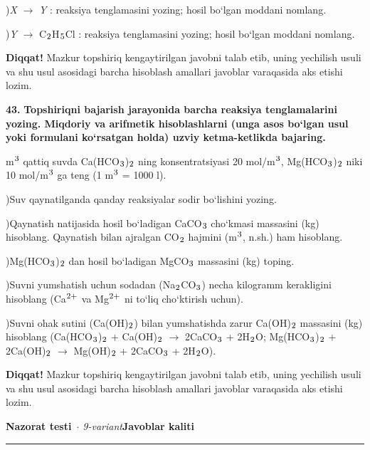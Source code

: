 \documentclass[11pt,a4paper]{article}
\renewcommand{\textsubscript}[1]{\ensuremath{_{\text{\fontsize{8}{8}\selectfont #1}}}}
\renewcommand{\textsuperscript}[1]{\ensuremath{^{\text{\fontsize{8}{8}\selectfont #1}}}}
\newcommand{\diqqat}[1]{\par\smallskip\noindent\textbf{Diqqat!} #1\par\medskip}
\begin{document}
)\textit{X} $\to$ \textit{Y} : reaksiya tenglamasini yozing; hosil bo`lgan moddani nomlang.\par
{})\textit{Y} $\to$ C\textsubscript{2}H\textsubscript{5}Cl : reaksiya tenglamasini yozing; hosil bo`lgan moddani nomlang.\par
\diqqat{Mazkur topshiriq kengaytirilgan javobni talab etib, uning yechilish usuli va shu usul asosidagi barcha hisoblash amallari javoblar varaqasida aks etishi lozim.}
\noindent\textbf{43.} \textbf{Topshiriqni bajarish jarayonida barcha reaksiya tenglamalarini yozing. Miqdoriy va arifmetik hisoblashlarni (unga asos bo`lgan usul yoki formulani ko`rsatgan holda) uzviy ketma-ketlikda bajaring.}\par{} m\textsuperscript{3} qattiq suvda Ca(HCO\textsubscript{3})\textsubscript{2} ning konsentratsiyasi 20 mol/m\textsuperscript{3}, Mg(HCO\textsubscript{3})\textsubscript{2} niki 10 mol/m\textsuperscript{3} ga teng (1 m\textsuperscript{3} = 1000 l).\par
{})Suv qaynatilganda qanday reaksiyalar sodir bo`lishini yozing.\par
{})Qaynatish natijasida hosil bo`ladigan CaCO\textsubscript{3} cho`kmasi massasini (kg) hisoblang. Qaynatish bilan ajralgan CO\textsubscript{2} hajmini (m\textsuperscript{3}, n.sh.) ham hisoblang.\par
{})Mg(HCO\textsubscript{3})\textsubscript{2} dan hosil bo`ladigan MgCO\textsubscript{3} massasini (kg) toping.\par
{})Suvni yumshatish uchun sodadan (Na\textsubscript{2}CO\textsubscript{3}) necha kilogramm kerakligini hisoblang (Ca\textsuperscript{2+} va Mg\textsuperscript{2+} ni to`liq cho`ktirish uchun).\par
{})Suvni ohak sutini (Ca(OH)\textsubscript{2}) bilan yumshatishda zarur Ca(OH)\textsubscript{2} massasini (kg) hisoblang (Ca(HCO\textsubscript{3})\textsubscript{2} + Ca(OH)\textsubscript{2} $\to$ 2CaCO\textsubscript{3} + 2H\textsubscript{2}O; Mg(HCO\textsubscript{3})\textsubscript{2} + 2Ca(OH)\textsubscript{2} $\to$ Mg(OH)\textsubscript{2} + 2CaCO\textsubscript{3} + 2H\textsubscript{2}O).\par
\diqqat{Mazkur topshiriq kengaytirilgan javobni talab etib, uning yechilish usuli va shu usul asosidagi barcha hisoblash amallari javoblar varaqasida aks etishi lozim.}
\newpage
\noindent\textbf{\fontsize{13}{15}\selectfont Nazorat testi}\ \textit{$\cdot$ 9-variant}\hfill \textbf{Javoblar kaliti}\par\smallskip\hrule\smallskip
\end{document}
